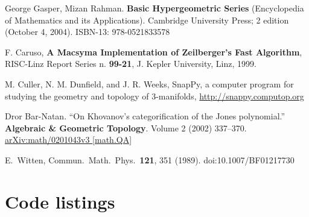 \documentclass[10pt]{amsart}
\begin{document}
\begin{thebibliography}{9}
George Gasper, Mizan Rahman.  \textbf{Basic Hypergeometric Series} (Encyclopedia of Mathematics and its Applications).  Cambridge University Press; 2 edition (October 4, 2004). ISBN-13: 978-0521833578
 
F. Caruso, \textbf{A Macsyma Implementation of Zeilberger's Fast Algorithm}, RISC-Linz Report Series n. \textbf{99-21}, J. Kepler University, Linz, 1999.

M. Culler, N. M. Dunfield, and J. R. Weeks, SnapPy, a computer program for studying the geometry and topology of 3-manifolds, \url{http://snappy.computop.org}

Dror Bar-Natan. ``On Khovanov’s categorification of the Jones polynomial.'' \textbf{Algebraic \& Geometric Topology}.  Volume 2 (2002) 337–370.  \href{http://arxiv.org/abs/math/0201043}{arXiv:math/0201043v3 [math.QA]}

  E.~Witten,
  Commun.\ Math.\ Phys.\  {\bf 121}, 351 (1989).
  doi:10.1007/BF01217730



\end{thebibliography}




\clearpage
\onecolumn

\section{Code listings}

\lstlistoflistings
\end{document}

